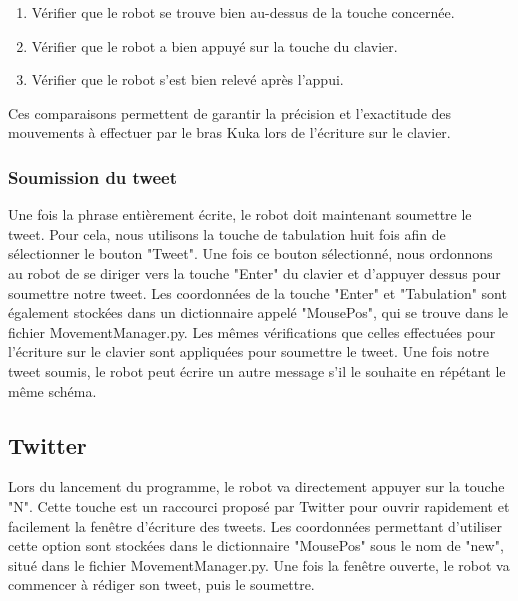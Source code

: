 \begin{enumerate}
    \item Vérifier que le robot se trouve bien au-dessus de la touche concernée.
    \item Vérifier que le robot a bien appuyé sur la touche du clavier.
    \item Vérifier que le robot s'est bien relevé après l'appui.
\end{enumerate}

Ces comparaisons permettent de garantir la précision et l’exactitude des mouvements à
effectuer par le bras Kuka lors de l’écriture sur le clavier.

\subsubsection{Soumission du tweet}

Une fois la phrase entièrement écrite, le robot doit maintenant soumettre le tweet.
Pour cela, nous utilisons la touche de tabulation huit fois afin de sélectionner le bouton "Tweet".
Une fois ce bouton sélectionné, nous ordonnons au robot de se diriger vers la touche "Enter" du clavier et d'appuyer dessus pour soumettre notre tweet.
Les coordonnées de la touche "Enter" et "Tabulation" sont également stockées dans un dictionnaire appelé "MousePos", qui se trouve dans le fichier MovementManager.py.
Les mêmes vérifications que celles effectuées pour l'écriture sur le clavier sont appliquées pour soumettre le tweet.
Une fois notre tweet soumis, le robot peut écrire un autre message s'il le souhaite en répétant le même schéma.

\subsection{Twitter}

Lors du lancement du programme, le robot va directement appuyer sur la touche "N".
Cette touche est un raccourci proposé par Twitter pour ouvrir rapidement et facilement la fenêtre d'écriture des tweets.
Les coordonnées permettant d'utiliser cette option sont stockées dans le dictionnaire "MousePos" sous le nom de "new", situé dans le fichier MovementManager.py.
Une fois la fenêtre ouverte, le robot va commencer à rédiger son tweet, puis le soumettre.

